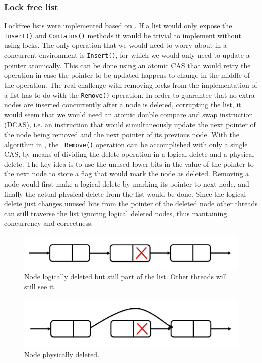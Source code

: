 \documentclass[11pt]{article}
\begin{document}
\subsubsection{Lock free list}
Lockfree lists were implemented based on \cite{Harris}. If a list would only
expose the {\tt Insert()} and {\tt Contains()} methods it would be trivial to
implement without using locks. The only operation that we would need to worry
about in a concurrent environment is {\tt Insert()}, for which we would only
need to update a pointer atomically. This can be done using an atomic CAS that
would retry the operation in case the pointer to be updated happens to change in
the middle of the operation. The real challenge with removing locks from the
implementation of a list has to do with the {\tt Remove()} operation. In order
to guarantee that no extra nodes are inserted concurrently after a node is
deleted, corrupting the list, it would seem that we would need an atomic double
compare and swap instruction (DCAS), i.e. an instruction that would
simultaneously update the next pointer of the node being removed and the next
pointer of its previous node. With the algorithm in \cite{Harris}, the {\tt
Remove()} operation can be accomplished with only a single CAS, by means of
dividing the delete operation in a logical delete and a physical delete. The key
idea is to use the unused lower bits in the value of the pointer to the next
node to store a flag that would mark the node as deleted. Removing a node would
first make a logical delete by marking its pointer to next node, and finally the
actual physical delete from the list would be done. Since the logical delete
just changes unused bits from the pointer of the deleted node other threads can
still traverse the list ignoring logical deleted nodes, thus mantaining
concurrency and correctness.

\begin{figure}[h]
\centering
\includegraphics[width=0.5\linewidth]{figs/patricio/logicallyDeleted.jpg}
\caption{Node logically deleted but still part of the list. Other threads will still see it.}
\label{fig:logicallyDeleted}
\end{figure}

\begin{figure}[h]
\centering
\includegraphics[width=0.5\linewidth]{figs/patricio/physicallyDeleted.jpg}
\caption{Node physically deleted.}
\label{fig:physicallyDeleted}
\end{figure}
\end{document}
